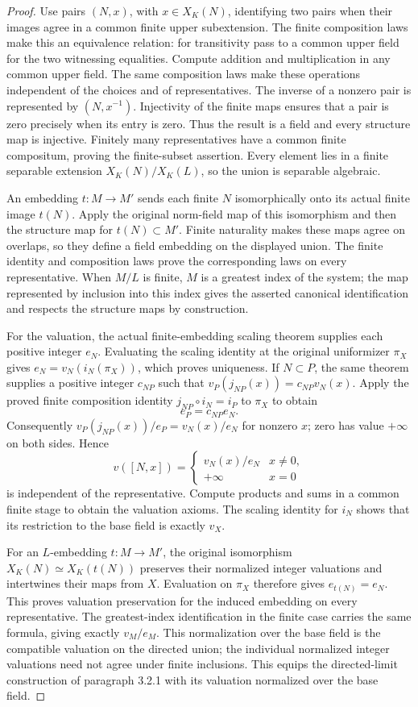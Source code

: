 \begin{proof}
Use pairs $(N,x)$, with $x\in X_K(N)$, identifying two pairs when
their images agree in a common finite upper subextension. The finite
composition laws make this an equivalence relation: for transitivity
pass to a common upper field for the two witnessing equalities.
Compute addition and multiplication in any common upper field.
The same composition laws make these operations independent of the
choices and of representatives. The inverse of a nonzero pair is
represented by $(N,x^{-1})$. Injectivity of the finite maps ensures
that a pair is zero precisely when its entry is zero. Thus the
result is a field and every structure map is injective.
Finitely many representatives have a common finite compositum,
proving the finite-subset assertion. Every element lies in a finite
separable extension $X_K(N)/X_K(L)$, so the union is separable algebraic.

An embedding $t:M\to M'$ sends each finite $N$ isomorphically onto
its actual finite image $t(N)$. Apply the original norm-field map of
this isomorphism and then the structure map for $t(N)\subset M'$.
Finite naturality makes these maps agree on overlaps, so they define
a field embedding on the displayed union. The finite identity and
composition laws prove the corresponding laws on every representative.
When $M/L$ is finite, $M$ is a greatest index of the system; the map
represented by inclusion into this index gives the asserted canonical
identification and respects the structure maps by construction.

For the valuation, the actual finite-embedding scaling theorem supplies
each positive integer $e_N$. Evaluating the scaling identity at the
original uniformizer $\pi_X$ gives
$e_N=v_N(i_N(\pi_X))$, which proves uniqueness. If $N\subset P$,
the same theorem supplies a positive integer $c_{NP}$ such that
$v_P(j_{NP}(x))=c_{NP}v_N(x)$. Apply the proved finite composition
identity $j_{NP}\circ i_N=i_P$ to $\pi_X$ to obtain
\[
 e_P=c_{NP}e_N.
\]
Consequently $v_P(j_{NP}(x))/e_P=v_N(x)/e_N$ for nonzero $x$;
zero has value $+\infty$ on both sides. Hence
\[
 v([N,x])=\begin{cases}v_N(x)/e_N&x\ne0,\\+\infty&x=0\end{cases}
\]
is independent of the representative. Compute products and sums in
a common finite stage to obtain the valuation axioms. The scaling
identity for $i_N$ shows that its restriction to the base field is
exactly $v_X$.

For an $L$-embedding $t:M\to M'$, the original isomorphism
$X_K(N)\simeq X_K(t(N))$ preserves their normalized integer
valuations and intertwines their maps from $X$. Evaluation on
$\pi_X$ therefore gives $e_{t(N)}=e_N$. This proves valuation
preservation for the induced embedding on every representative.
The greatest-index identification in the finite case carries the
same formula, giving exactly $v_M/e_M$. This normalization over
the base field is the compatible valuation on the directed union;
the individual normalized integer valuations need not agree under
finite inclusions. This equips the directed-limit construction of
paragraph 3.2.1 with its valuation normalized over the base field.
\end{proof}

